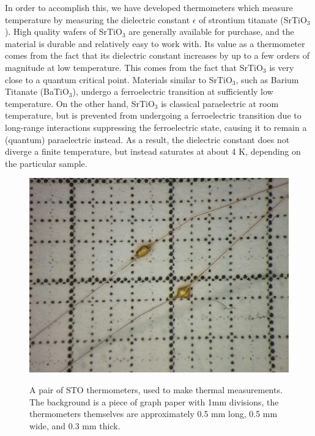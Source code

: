 \documentclass{thesis-umich}
\begin{document}
In order to accomplish this, we have developed thermometers which measure
temperature by measuring the dielectric constant $\epsilon$ of strontium
titanate (SrTiO$_3$). High quality wafers of SrTiO$_3$ are generally available
for purchase, and the material is durable and relatively easy to work with. Its
value as a thermometer comes from the fact that its dielectric constant
increases by up to a few orders of magnitude at low temperature. This comes from
the fact that SrTiO$_3$ is very close to a quantum critical
point\cite{Rowley2014}. Materials similar to SrTiO$_3$, such as Barium Titanate
(BaTiO$_3$), undergo a ferroelectric transition at sufficiently low temperature.
On the other hand, SrTiO$_3$ is classical paraelectric at room temperature, but
is prevented from undergoing a ferroelectric transition due to long-range
interactions suppressing the ferroelectric state, causing it to remain a
(quantum) paraelectric instead. As a result, the dielectric constant does not
diverge a finite temperature, but instead saturates at about 4 K, depending on
the particular sample.

\begin{figure} \caption[A pair of STO thermometers]{A pair of STO thermometers, used to make thermal
  measurements. The background is a piece of graph paper with 1mm divisions, the
thermometers themselves are approximately 0.5 mm long, 0.5 mm wide, and 0.3 mm
thick.} \centering
\includegraphics[width=\columnwidth]{figures/thermometers_apl.jpg}\label{thermo_pic}
\end{figure}
\end{document}
